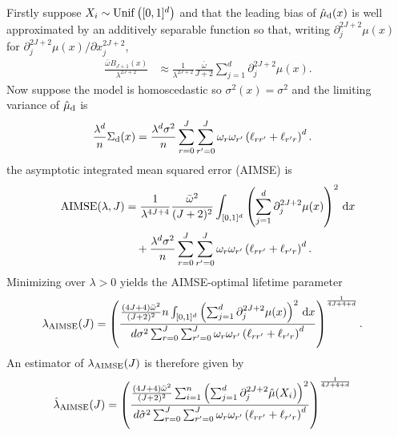 Firstly suppose $X_i \sim \operatorname{Unif}\big([0,1]^d\big)$
and that the leading bias of $\hat\mu_{\mathrm{d}}(x)$ is well approximated by an
additively separable function so that,
writing $\partial^{2 J + 2}_j \mu(x)$
for $\partial^{2 J + 2}_j \mu(x) / \partial x_j^{2 J + 2}$,
%
\begin{align*}
  \frac{\bar \omega B_{J+1}(x)}{\lambda^{2 J + 2}}
  &\approx
  \frac{1}{\lambda^{2 J + 2}}
  \frac{\bar \omega }{J + 2}
  \sum_{j=1}^d
  \partial^{2 J + 2}_j \mu(x).
\end{align*}
%
Now suppose the model is homoscedastic so $\sigma^2(x) = \sigma^2$ and
the limiting variance of $\hat\mu_{\mathrm{d}}$ is
%
\begin{align*}
  \frac{\lambda^d}{n}
  \Sigma_{\mathrm{d}}(x)
  &=
  \frac{\lambda^d \sigma^2}{n}
  \sum_{r=0}^{J}
  \sum_{r'=0}^{J}
  \omega_r
  \omega_{r'}
  \left( \ell_{r r'} + \ell_{r' r} \right)^d.
\end{align*}
%
the asymptotic integrated mean squared error (AIMSE) is
%
\begin{align*}
  \operatorname{AIMSE}(\lambda, J)
  &=
  \frac{1}{\lambda^{4 J + 4}}
  \frac{\bar \omega^2}{(J + 2)^2}
  \int_{[0,1]^d}
  \left(
    \sum_{j=1}^d
    \partial^{2 J + 2}_j \mu(x)
  \right)^2
  \,\mathrm{d}x \\
  &\quad+
  \frac{\lambda^d \sigma^2}{n}
  \sum_{r=0}^{J}
  \sum_{r'=0}^{J}
  \omega_r
  \omega_{r'}
  \left( \ell_{r r'} + \ell_{r' r} \right)^d.
\end{align*}
%
Minimizing over $\lambda > 0$ yields the AIMSE-optimal lifetime parameter
%
\begin{align*}
  \lambda_{\operatorname{AIMSE}}(J)
  &=
  \left(
    \frac{
      \frac{(4 J + 4) \bar \omega^2}{(J + 2)^2}
      n \int_{[0,1]^d}
      \left(
        \sum_{j=1}^d
        \partial^{2 J + 2}_j \mu(x)
      \right)^2
      \,\mathrm{d}x
    }{
      d \sigma^2
      \sum_{r=0}^{J}
      \sum_{r'=0}^{J}
      \omega_r
      \omega_{r'}
      \left( \ell_{r r'} + \ell_{r' r} \right)^d
    }
  \right)^{\frac{1}{4 J + 4 + d}}.
\end{align*}
%
An estimator of $\lambda_{\operatorname{AIMSE}}(J)$ is therefore given by
%
\begin{align*}
  \hat\lambda_{\operatorname{AIMSE}}(J)
  &=
  \left(
    \frac{
      \frac{(4 J + 4) \bar \omega^2}{(J + 2)^2}
      \sum_{i=1}^n
      \left(
        \sum_{j=1}^d
        \partial^{2 J + 2}_j \hat\mu(X_i)
      \right)^2
    }{
      d \hat\sigma^2
      \sum_{r=0}^{J}
      \sum_{r'=0}^{J}
      \omega_r
      \omega_{r'}
      \left( \ell_{r r'} + \ell_{r' r} \right)^d
    }
  \right)^{\frac{1}{4 J + 4 + d}}
\end{align*}
